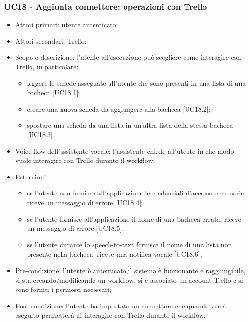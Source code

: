 \subsubsection{UC18 - Aggiunta connettore: operazioni con Trello}
\begin{itemize}
	\item  Attori primari: utente autenticato;
     \item  Attori secondari: Trello;
	\item  Scopo e descrizione: l'utente all'esecuzione può scegliere come interagire con Trello, in particolare:
		   \begin{itemize}
				\item leggere le schede assegnate all'utente che sono presenti in una lista di una bacheca [UC18.1];
				\item creare una nuova scheda da aggiungere alla bacheca [UC18.2];
				\item spostare una scheda da una lista in un'altra lista della stessa bacheca [UC18.3].
		   \end{itemize}
	\item  Voice flow dell'assistente vocale: l'assistente chiede all'utente in che modo vuole interagire con Trello durante il workflow;
	\item  Estensioni: 
		   \begin{itemize}
				\item se l'utente non fornisce all'applicazione le credenziali d'accesso necessarie riceve un messaggio di errore [UC18.4];
				\item se l'utente fornisce all'applicazione il nome di una bacheca errata, riceve un messaggio di errore [UC18.5];
				\item se l'utente durante lo speech-to-text fornisce il nome di una lista non presente nella bacheca, riceve una notifica vocale [UC18.6];
		   \end{itemize}
	\item  Pre-condizione: l'utente è autenticato,il sistema è funzionante e raggiungibile, si sta creando/modificando un workflow, si è associato un account Trello e si sono forniti i permessi necessari;
	\item  Post-condizione: l'utente ha impostato un connettore che quando verrà eseguito permetterà di interagire con Trello durante il workflow.
\end{itemize}
